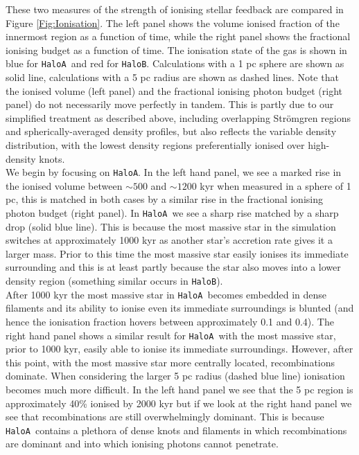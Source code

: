 \documentclass[twocolumn,iop,revtex4]{openjournal}
\newcommand{\ha} {\texttt{HaloA~}}
\newcommand{\hac} {\texttt{HaloA}}
\newcommand{\hbc} {\texttt{HaloB}}
\begin{document}
These two measures of the strength of ionising stellar feedback are compared in
Figure \ref{Fig:Ionisation}. The left panel shows the volume ionised fraction of the innermost
region as a function of time, while the right panel shows
the fractional ionising budget as a function of time. The ionisation state of the gas is shown in
blue for \ha and red for \hbc. Calculations with a 1 pc sphere are shown as solid line, calculations
with a 5 pc radius are shown as dashed lines. Note that the ionised volume (left panel)
and the fractional ionising photon budget (right panel) do not necessarily
move perfectly in tandem. This is partly due to our simplified treatment as described above,
including overlapping Str{\" o}mgren regions and spherically-averaged density profiles, but also
reflects the variable density distribution, with the lowest density regions preferentially
ionised over high-density knots. \\
\indent We begin by focusing on \hac. In the left hand panel, we see a marked rise in the
ionised volume between $\sim 500$ and $\sim 1200$ kyr when measured in a sphere of 1 pc, this is
matched in both cases by a similar rise in the fractional ionising photon budget (right panel).
In \ha we see a sharp rise matched by a sharp drop (solid blue line). This is because the most
massive star in the simulation switches at approximately 1000 kyr as another star's accretion rate
gives it a larger mass. Prior to this time the most massive star easily ionises its immediate
surrounding and this is at least partly because the star also moves into a lower density region
(something similar occurs in \hbc). \\
\indent After 1000 kyr the most massive star in \ha becomes embedded in
dense filaments and its ability to ionise even its immediate surroundings is blunted (and hence the
ionisation fraction hovers between approximately 0.1 and 0.4). The
right hand panel shows a similar result for \ha with the most massive star, prior to 1000 kyr, easily
able to ionise
its immediate surroundings. However, after this point, with the most massive star more centrally
located, recombinations dominate. When considering the larger 5 pc radius (dashed blue line)
ionisation becomes much more difficult. In the left hand panel we see that the 5 pc region
is approximately 40\% ionised by 2000 kyr but if we look at the right hand panel we see that
recombinations are still overwhelmingly dominant. This is because \ha contains a plethora of dense knots and
filaments in which recombinations are dominant and into which ionising photons cannot penetrate. \\
\end{document}
